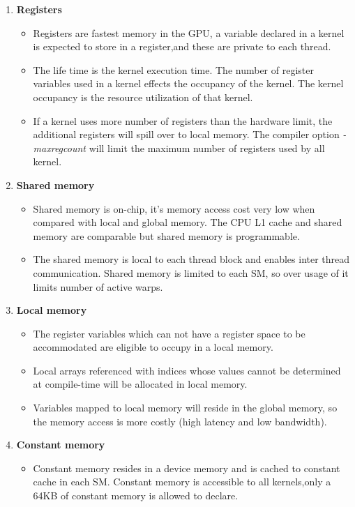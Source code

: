 \begin{enumerate}
\enlargethispage{-\baselineskip}
\item \textbf{Registers}
\begin{itemize}
\item Registers are fastest memory in the GPU, a variable declared in a kernel is expected to store in a register,and these are private to each thread.
\item The life time is the kernel execution time. The number of register variables used in a kernel effects the occupancy of the kernel. The kernel occupancy is the resource utilization of that kernel.
\item  If a kernel uses more number of registers than the hardware limit, the additional registers will spill over to local memory. The compiler option \textit{-maxregcount} will limit the maximum number of registers used by all kernel.
\end{itemize} 
\item \textbf{Shared memory}
\begin{itemize}
\item Shared memory is on-chip, it's memory access cost very low when compared with local and global memory. The CPU L1 cache and shared memory are comparable but shared memory is programmable.
\item The shared memory is local to each thread block and enables inter thread communication. Shared memory is limited to each SM, so over usage of it limits number of active warps.
\end{itemize}
\item \textbf{Local memory}
\begin{itemize}
\item The register variables which can not have a register space to be accommodated are eligible to occupy in a local memory.
\item Local arrays referenced with indices whose values cannot be determined at compile-time will be allocated in local memory.
\item Variables mapped to local memory will reside in the global memory, so the memory access is more costly (high latency and low bandwidth).
\end{itemize}
\item \textbf{Constant memory}
\begin{itemize}
\item Constant memory resides in a device memory and is cached to constant cache in each SM. Constant memory is accessible to all kernels,only a 64KB of constant memory is allowed to declare.

\end{itemize}
\end{enumerate}
